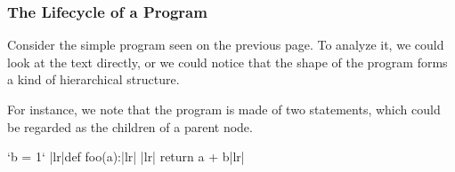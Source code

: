 \documentclass[aspectratio=169, handout]{beamer}
\begin{document}
\begin{frame}[fragile]
  \frametitle{The Lifecycle of a Program}

  Consider the simple program seen on the previous page. To analyze it, we could
  look at the text directly, or we could notice that the shape of the program forms
  a kind of hierarchical structure.

  \vspace{5pt}

  For instance, we note that the program is made of two statements, which could be
  regarded as the children of a parent node.

  \vspace{8pt}

  \begin{minipage}[t][1in][t]{\textwidth}
    \begin{minipage}{0.3\textwidth}
      \begin{pythoncodeblock}
        `b = 1`
        |lr|def foo(a):|lr|
        |lr|  return a + b|lr|
      \end{pythoncodeblock}
    \end{minipage}
    \begin{minipage}{0.65\textwidth}
      \begin{center}
    \end{center}
    \end{minipage}
  \end{minipage}

  \vspace{8pt}

\end{frame}
\end{document}
